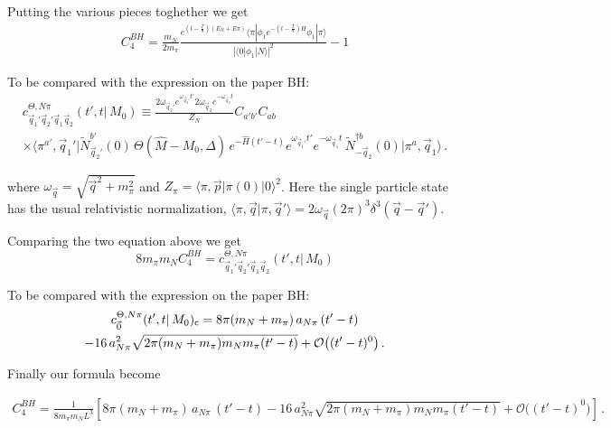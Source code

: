 \documentclass[10pt,a4paper]{article}
\begin{document}
Putting the various pieces toghether we get
\begin{gather}
C_4^{BH}=\frac{m_N}{ 2 m_\pi }\frac{
  e^{ (t-\frac{T}{8})(E_N+E\pi)} \langle \pi|   \phi_1 e^{-(t-\frac{T}{8})H}\phi_1 
 | \pi\rangle  
}{
 |\langle 0| \phi_1 | N\rangle|^2  
}-1
\end{gather}
\begin{tcolorbox}
{To be compared with the expression on the  paper BH:
 \begin{multline}
\label{eq:cThetaNpiDef}
c^{\Theta, N \pi}_{\vec q_1' \vec q_2' \vec q_1 \vec q_2}(t', t \vert \, M_0) \equiv \frac{ 2 \omega_{\vec q_2'} e^{\omega_{\vec q_2'} t' } 2 \omega_{\vec q_2 } e^{- \omega_{\vec q_2 } t } }{Z_N} C_{a'b'} C_{ab} \, \\
\times \langle \pi^{a'} , \vec q_1' \vert \widetilde N^{b'}_{ \vec q_2'}(0) \, \Theta(\hat M - M_0, \Delta) \, e^{- \hat H(t' - t)} e^{ \omega_{\vec q_1'} t'} e^{ - \omega_{\vec q_1} t} \, \widetilde N^{\dagger b}_{-\vec q_2}(0) \vert \pi^{a}, \vec q_1 \rangle \,.
\nonumber
\end{multline}
}
\end{tcolorbox}

\begin{tcolorbox}
where $\omega_{\vec q} = \sqrt{\vec q^2 + m_\pi^2}$ and $Z_\pi = \langle \pi, \vec p \vert \pi(0) \vert 0 \rangle^2$. Here the single particle state has the usual relativistic normalization, $\langle \pi, \vec q \vert \pi, \vec q' \rangle = 2 \omega_{\vec q} (2 \pi)^3 \delta^3(\vec q - \vec q')$.
\end{tcolorbox}
Comparing the two equation above we get 
\begin{equation}
8m_\pi m_N C_4^{BH}=  c^{\Theta, N \pi}_{\vec q_1' \vec q_2' \vec q_1 \vec q_2}(t', t \vert \, M_0)
\end{equation}
 
 \begin{tcolorbox}
 To be compared with the expression on the  paper BH:
 \begin{multline}
c^{\Theta, N \pi}_{\vec 0}(t', t \vert \, M_0) _{\sf c} = 8 \pi (m_N + m_\pi) \, a_{N\pi} \, (t' - t ) \\
- 16 \, a_{N \pi}^2 \sqrt{2 \pi (m_N + m_\pi) m_N m_\pi (t'-t)} + \mathcal O \big ((t'-t)^0\big) \,.\nonumber
\end{multline}
 \end{tcolorbox}
Finally our formula become 

\begin{multline}
 C_4^{BH}=  \frac{1}{8m_\pi m_N L^3}\left[ 8 \pi (m_N + m_\pi) \, a_{N\pi} \, (t' - t ) 
- 16 \, a_{N \pi}^2 \sqrt{2 \pi (m_N + m_\pi) m_N m_\pi (t'-t)} + \mathcal O \big ((t'-t)^0\big) \right]\,.\nonumber
\end{multline} 
 
 
 
 
 
\end{document}
